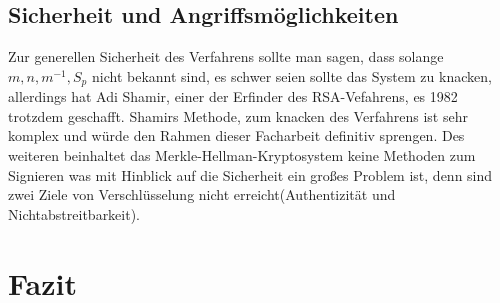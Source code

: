 \documentclass[a4paper,12pt,titlepage]{article}
\begin{document}
\subsection{Sicherheit und Angriffsmöglichkeiten}
Zur generellen Sicherheit des Verfahrens sollte man sagen, dass solange $m, n, m^{-1}, S_p$ nicht bekannt sind, es schwer seien sollte das System zu knacken, allerdings hat Adi Shamir, einer der Erfinder des RSA-Vefahrens, es 1982 trotzdem geschafft. Shamirs Methode, zum knacken des Verfahrens ist sehr komplex und würde den Rahmen dieser Facharbeit definitiv sprengen. Des weiteren beinhaltet das Merkle-Hellman-Kryptosystem keine Methoden zum Signieren was mit Hinblick auf die Sicherheit ein großes Problem ist, denn sind zwei Ziele von Verschlüsselung nicht erreicht(Authentizität und Nichtabstreitbarkeit). %



\newpage
\section{Fazit}
\cite{delfs_knebl} \cite{oneway_lukas} \cite{asymm_gesch} \cite{martin_bio} \cite{ralph_bio} \cite{schlusselverteilung} \cite{merklehellman_neer}\cite{fa_asymm_hendrik}
\newpage


\begin{flushleft}

\end{flushleft}
\end{document}
